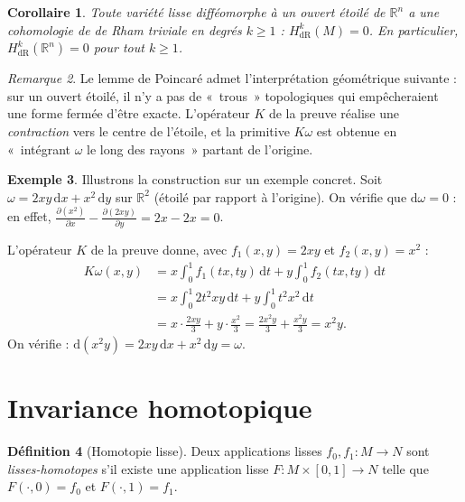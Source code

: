 \documentclass[12pt,a4paper,openany]{book}
\theoremstyle{definition}
\newtheorem{definition}{Définition}[chapter]
\newtheorem{exemple}[definition]{Exemple}
\theoremstyle{plain}
\newtheorem{corollaire}[definition]{Corollaire}
\theoremstyle{remark}
\newtheorem{remarque}[definition]{Remarque}
\newcommand{\R}{\mathbb{R}}
\newcommand{\dd}{\mathrm{d}}
\begin{document}
\begin{corollaire}\label{cor:poincare-contractile}
Toute variété lisse difféomorphe à un ouvert étoilé de $\R^n$ a une
cohomologie de de Rham triviale en degrés $k \geq 1$ : $H^k_{\mathrm{dR}}(M) = 0$.
En particulier, $H^k_{\mathrm{dR}}(\R^n) = 0$ pour tout $k \geq 1$.
\end{corollaire}

\begin{remarque}\label{rem:poincare-geometrie}
Le lemme de Poincaré admet l'interprétation géométrique suivante : sur un
ouvert étoilé, il n'y a pas de «~trous~» topologiques qui empêcheraient une
forme fermée d'être exacte. L'opérateur $K$ de la preuve réalise une
\emph{contraction} vers le centre de l'étoile, et la primitive $K\omega$
est obtenue en «~intégrant $\omega$ le long des rayons~» partant de l'origine.
\end{remarque}

\begin{exemple}\label{ex:poincare-calcul}
Illustrons la construction sur un exemple concret. Soit
$\omega = 2xy\,\dd x + x^2\,\dd y$ sur $\R^2$ (étoilé par rapport à l'origine).
On vérifie que $\dd\omega = 0$ : en effet,
$\frac{\partial(x^2)}{\partial x} - \frac{\partial(2xy)}{\partial y} = 2x - 2x = 0$.

L'opérateur $K$ de la preuve donne, avec $f_1(x,y) = 2xy$ et
$f_2(x,y) = x^2$ :
\begin{align*}
  K\omega(x,y) &= x \int_0^1 f_1(tx,ty)\,\dd t
                 + y \int_0^1 f_2(tx,ty)\,\dd t \\
  &= x \int_0^1 2t^2 xy\,\dd t + y \int_0^1 t^2 x^2\,\dd t \\
  &= x \cdot \frac{2x y}{3} + y \cdot \frac{x^2}{3}
  = \frac{2x^2y}{3} + \frac{x^2 y}{3} = x^2 y.
\end{align*}
On vérifie : $\dd(x^2 y) = 2xy\,\dd x + x^2\,\dd y = \omega$.
\end{exemple}

\section{Invariance homotopique}\label{sec:invariance-homotopique}

\begin{definition}[Homotopie lisse]\label{def:homotopie-lisse}
Deux applications lisses $f_0, f_1 \colon M \to N$ sont \emph{lisses-homotopes}
s'il existe une application lisse $F \colon M \times [0,1] \to N$ telle que
$F(\cdot, 0) = f_0$ et $F(\cdot, 1) = f_1$.
\end{definition}
\end{document}
